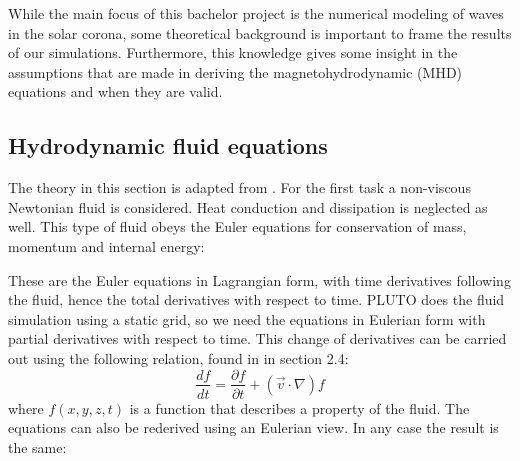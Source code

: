 While the main focus of this bachelor project is the numerical modeling of waves in the solar corona, some theoretical background is important to frame the results of our simulations.
Furthermore, this knowledge gives some insight in the assumptions that are made in deriving the magnetohydrodynamic (MHD) equations and when they are valid.

\subsection{Hydrodynamic fluid equations}
The theory in this section is adapted from \cite{notes-fluid-dynamics}. For the first task a non-viscous Newtonian fluid is considered. Heat conduction and dissipation is neglected as well.
This type of fluid obeys the Euler equations for conservation of mass, momentum and internal energy:

{\centering
\noindent {}\par}


These are the Euler equations in Lagrangian form, with time derivatives following the fluid, hence the total derivatives with respect to time.
PLUTO does the fluid simulation using a static grid, so we need the equations in Eulerian form with partial derivatives with respect to time.
This change of derivatives can be carried out using the following relation, found in \cite{notes-fluid-dynamics} in section 2.4:
\begin{equation}
	\frac{df}{dt} = \frac{\partial f}{\partial t} + (\vec{v} \cdot \nabla) f
	\label{eq:relation-total-partial}
\end{equation}
where $f(x,y,z,t)$ is a function that describes a property of the fluid. The equations can also be rederived using an Eulerian view. In any case the result is the same:

{\centering 
\noindent {}
\par}

